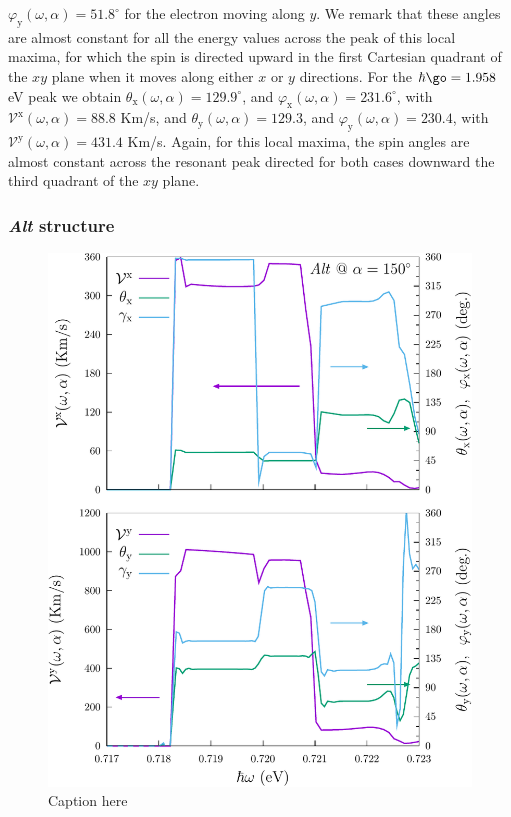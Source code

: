 \documentclass[prb,11pt,tightenlines,twocolumn,aps]{revtex4-1}
\begin{document}
$\varphi_{\mathrm{y}} (\omega,\alpha) = 51.8^{\circ}$
% 
for the electron moving along $y$. We remark that these angles are almost
constant for all the energy values across the peak of this local maxima, for
which the spin is directed upward in the first Cartesian quadrant of the $xy$
plane when it moves along either $x$ or $y$ directions. 
% 
For the $\hbar\go=1.958$\,eV peak we obtain 
$\theta_{\mathrm{x}} (\omega,\alpha) = 129.9^{\circ}$, and 
$\varphi_{\mathrm{x}} (\omega,\alpha) = 231.6^{\circ}$, with 
$\mathcal{V}^{\mathrm{x}} (\omega,\alpha) = 88.8$ Km/s, and
% 
$\theta_{\mathrm{y}}(\omega,\alpha) =129.3$, and
$\varphi_{\mathrm{y}}(\omega,\alpha) = 230.4$, with 
$\mathcal{V}^{\mathrm{y}} (\omega,\alpha) = 431.4$ Km/s. 
% 
Again, for this local maxima, the spin angles are almost constant across the
resonant peak directed for both cases downward the third quadrant of the $xy$
plane.

\subsubsection{\emph{Alt} structure}

\begin{figure}[tb]
    \centering
    \includegraphics[width=\linewidth]{altplots/alt-vx-vy-w1}
    \caption{Caption here}
    \label{fig:alt-vx-vy-w1}
\end{figure}
\end{document}
